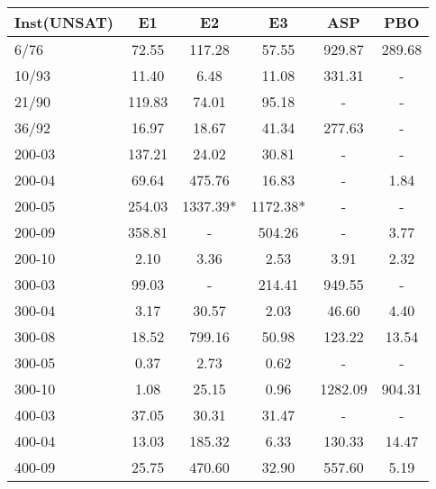 \begin{tabular}{ l|ccccc }
Inst(UNSAT) &E1 &E2 &E3 &ASP    &PBO\\
    \hline
6/76   &72.55  &117.28 &57.55  &929.87 &289.68\\
10/93  &11.40  &6.48   &11.08  &331.31 &-\\
21/90  &119.83 &74.01  &95.18  &-  &-\\
36/92  &16.97  &18.67  &41.34  &277.63 &-\\
200-03 &137.21 &24.02  &30.81  &-  &-\\
200-04 &69.64  &475.76 &16.83  &-  &1.84\\
200-05 &254.03 &1337.39*   &1172.38*   &-  &-\\
200-09 &358.81 &-  &504.26 &-  &3.77\\
200-10 &2.10   &3.36   &2.53   &3.91   &2.32\\
300-03 &99.03  &-  &214.41 &949.55 &-\\
300-04 &3.17   &30.57  &2.03   &46.60  &4.40\\
300-08 &18.52  &799.16 &50.98  &123.22 &13.54\\
300-05 &0.37   &2.73   &0.62   &-  &-\\
300-10 &1.08   &25.15  &0.96   &1282.09    &904.31\\
400-03 &37.05  &30.31  &31.47  &-  &-\\
400-04 &13.03  &185.32 &6.33   &130.33 &14.47\\
400-09 &25.75  &470.60 &32.90  &557.60 &5.19\\
    \hline
\end{tabular}
